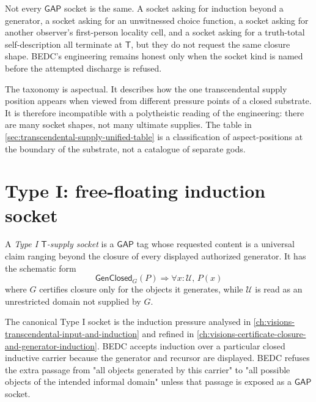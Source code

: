 \begin{principle}
\label{prin:transcendental-supply-taxonomic-necessity}
Not every $\mathsf{GAP}$ socket is the same. A socket asking for induction beyond a generator, a socket asking for an unwitnessed choice function, a socket asking for another observer's first-person locality cell, and a socket asking for a truth-total self-description all terminate at $\mathsf{T}$, but they do not request the same closure shape. BEDC's engineering remains honest only when the socket kind is named before the attempted discharge is refused.
\end{principle}

\begin{remark}
\label{rem:transcendental-supply-aspect-position}
The taxonomy is aspectual. It describes how the one transcendental supply position appears when viewed from different pressure points of a closed substrate. It is therefore incompatible with a polytheistic reading of the engineering: there are many socket shapes, not many ultimate supplies. The table in \autoref{sec:transcendental-supply-unified-table} is a classification of aspect-positions at the boundary of the substrate, not a catalogue of separate gods.
\end{remark}

\section{Type I: free-floating induction socket}
\label{sec:transcendental-supply-type-I}

\begin{definition}
\label{def:transcendental-supply-type-I}
A \emph{Type I $\mathsf{T}$-supply socket} is a $\mathsf{GAP}$ tag whose requested content is a universal claim ranging beyond the closure of every displayed authorized generator. It has the schematic form
$$
\mathsf{GenClosed}_G(P)\Longrightarrow \forall x:\mathcal{U},\,P(x)
$$
where $G$ certifies closure only for the objects it generates, while $\mathcal{U}$ is read as an unrestricted domain not supplied by $G$.
\end{definition}

\begin{example}
\label{ex:transcendental-supply-type-I-engineering}
The canonical Type I socket is the induction pressure analysed in \autoref{ch:visions-transcendental-input-and-induction} and refined in \autoref{ch:visions-certificate-closure-and-generator-induction}. BEDC accepts induction over a particular closed inductive carrier because the generator and recursor are displayed. BEDC refuses the extra passage from "all objects generated by this carrier" to "all possible objects of the intended informal domain" unless that passage is exposed as a $\mathsf{GAP}$ socket.
\end{example}

